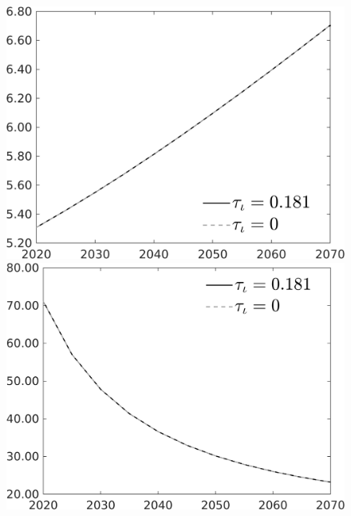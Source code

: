 \documentclass[12pt]{article}
\begin{document}
\begin{figure}[h!!]
\begin{minipage}[]{0.32\textwidth}
	\end{minipage}	
	\begin{minipage}[]{0.32\textwidth}
		\includegraphics[width=1\textwidth]{../../codding_model/own_basedOnFried/optimalPol_010922_revision/figures/all_13Sept22/CompTauf_bytaul_Reg0_gAn_spillover0_nsk0_xgr1_knspil0_sep1_LFlimit1_emsbase0_countec0_GovRev0_etaa0.79_lgd1.png}
	\end{minipage}	
	\begin{minipage}[]{0.32\textwidth}
		\includegraphics[width=1\textwidth]{../../codding_model/own_basedOnFried/optimalPol_010922_revision/figures/all_13Sept22/CompTauf_bytaul_Reg0_gAg_spillover0_nsk0_xgr1_knspil0_sep1_LFlimit1_emsbase0_countec0_GovRev0_etaa0.79_lgd1.png}
	\end{minipage}	
\end{figure}
\end{document}
